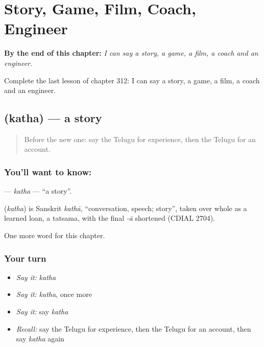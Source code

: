 
\chapter{Story, Game, Film, Coach, Engineer}
\label{ch:te-story-game-film-coach-engineer}

\begin{chapteropening}
\textbf{By the end of this chapter:} \emph{I can say a story, a game, a film, a coach and an engineer.}

Complete the last lesson of chapter 312: I can say a story, a game, a film, a coach and an engineer.
\end{chapteropening}

\section[\texorpdfstring{\te{కథ} (katha)}{కథ (katha)}]{ (katha) — a story}

\label{lesson:TE-C312-katha}



\begin{quote}
Before the new one: say the Telugu for experience, then the Telugu for an account.
\end{quote}

\subsection*{You'll want to know: }
\textbf{} — \emph{katha} — \textquotedblleft{}a story\textquotedblright{}.

\begin{cousinweb}
\textbf{} (\emph{katha}) is Sanskrit \emph{kathā}, \textquotedblleft{}conversation, speech; story\textquotedblright{}, taken over whole as a learned loan, a tatsama, with the final \emph{-ā} shortened (CDIAL 2704).
\end{cousinweb}

\begin{grammarlens}[title={What you've built}]
One more word for this chapter.
\end{grammarlens}

\subsection*{Your turn}
\begin{itemize}
\raggedright
  \item \emph{Say it:} \emph{katha}
  \item \emph{Say it:} \emph{katha}, once more
  \item \emph{Say it:} say \emph{katha}
  \item \emph{Recall:} say the Telugu for experience, then the Telugu for an account, then say \emph{katha} again
\end{itemize}

